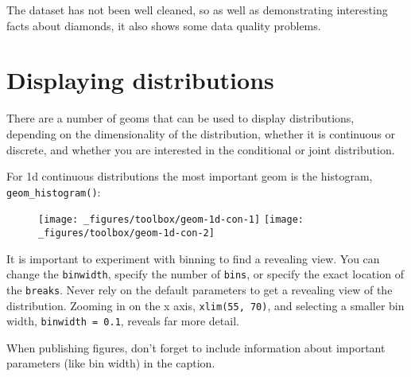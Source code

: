 The dataset has not been well cleaned, so as well as demonstrating
interesting facts about diamonds, it also shows some data quality
problems.

\hypertarget{sec:distributions}{\section{Displaying
distributions}\label{sec:distributions}}

There are a number of geoms that can be used to display distributions,
depending on the dimensionality of the distribution, whether it is
continuous or discrete, and whether you are interested in the
conditional or joint distribution. 

For 1d continuous distributions the most important geom is the
histogram, \texttt{geom\_histogram()}: 

\begin{Shaded}
\begin{Highlighting}[]
\StringTok{ }
\StringTok{  }\NormalTok{()}
\StringTok{ }
\StringTok{  }\NormalTok{(} \NormalTok{) +}\StringTok{ }
\StringTok{  }\NormalTok{(}\NormalTok{, }\NormalTok{)}
\end{Highlighting}
\end{Shaded}

\begin{figure}[H]
  \texttt{[image: \_figures/toolbox/geom-1d-con-1]}%
  \texttt{[image: \_figures/toolbox/geom-1d-con-2]}
\end{figure}

It is important to experiment with binning to find a revealing view. You
can change the \texttt{binwidth}, specify the number of \texttt{bins},
or specify the exact location of the \texttt{breaks}. Never rely on the
default parameters to get a revealing view of the distribution. Zooming
in on the x axis, \texttt{xlim(55,\ 70)}, and selecting a smaller bin
width, \texttt{binwidth\ =\ 0.1}, reveals far more detail.

When publishing figures, don't forget to include information about
important parameters (like bin width) in the caption.

